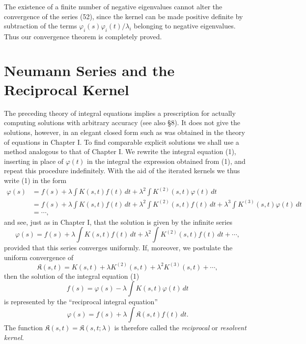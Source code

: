 The existence of a finite number of negative eigenvalues cannot alter the convergence of the series (52), since the kernel can be made positive definite by subtraction of the terms $\varphi_i(s)\varphi_i(t)/\lambda_i$ belonging to negative eigenvalues. Thus our convergence theorem is completely proved.

\section{Neumann Series and the Reciprocal Kernel}
The preceding theory of integral equations implies a prescription for actually computing solutions with arbitrary accuracy (see also \S8). It does not give the solutions, however, in an elegant closed form such as was obtained in the theory of equations in Chapter I. To find comparable explicit solutions we shall use a method analogous to that of Chapter I. We rewrite the integral equation (1), inserting in place of $\varphi(t)$ in the integral the expression obtained from (1), and repeat this procedure indefinitely. With the aid of the iterated kernels we thus write (1) in the form
\[
\begin{aligned}
\varphi(s)
&=f(s)+\lambda\int K(s,t)f(t)\,dt
+\lambda^2\int K^{(2)}(s,t)\varphi(t)\,dt\\
&=f(s)+\lambda\int K(s,t)f(t)\,dt
+\lambda^2\int K^{(2)}(s,t)f(t)\,dt
+\lambda^3\int K^{(3)}(s,t)\varphi(t)\,dt\\
&=\cdots,
\end{aligned}
\]
and see, just as in Chapter I, that the solution is given by the infinite series
\begin{equation}\tag{60}
\varphi(s)=f(s)+\lambda\int K(s,t)f(t)\,dt
+\lambda^2\int K^{(2)}(s,t)f(t)\,dt+\cdots,
\end{equation}
provided that this series converges uniformly. If, moreover, we postulate the uniform convergence of
\begin{equation}\tag{61}
\mathfrak{K}(s,t)=K(s,t)+\lambda K^{(2)}(s,t)+\lambda^2K^{(3)}(s,t)+\cdots,
\end{equation}
then the solution of the integral equation (1)
\[
f(s)=\varphi(s)-\lambda\int K(s,t)\varphi(t)\,dt
\]
is represented by the ``reciprocal integral equation''
\begin{equation}\tag{62}
\varphi(s)=f(s)+\lambda\int \mathfrak{K}(s,t)f(t)\,dt.
\end{equation}
The function $\mathfrak{K}(s,t)=\mathfrak{K}(s,t;\lambda)$ is therefore called the \emph{reciprocal} or \emph{resolvent kernel}.

